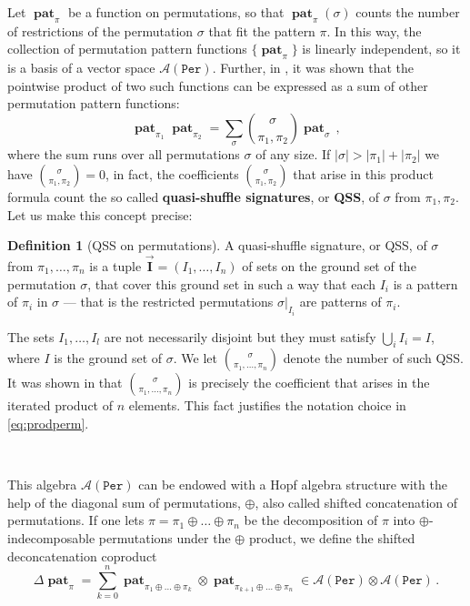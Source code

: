 \documentclass[12pt, reqno]{amsart}
\theoremstyle{definition}
\newtheorem{defin}[thm]{Definition}
\newcommand{\III}{\vec{\mathbf{I}}}
\DeclareMathOperator{\pat}{\mathbf{pat}}
\begin{document}
Let $\pat_{\pi}$ be a function on permutations, so that $\pat_{\pi}(\sigma)$ counts the number of restrictions of the permutation $\sigma$ that fit the pattern $\pi$.
In this way, the collection of permutation pattern functions $\{\pat_{\pi}\}$ is linearly independent, so it is a basis of a vector space $\mathcal A (\mathtt{Per})$.
Further, in \cite{Vargas}, it was shown that the pointwise product of two such functions can be expressed as a sum of other permutation pattern functions:
\begin{equation}\label{eq:prodperm}
\pat_{\pi_1} \pat_{\pi_2} = \sum_{\sigma} \binom{\sigma}{\pi_1, \pi_2} \pat_{\sigma} \, ,
\end{equation}
where the sum runs over all permutations $\sigma$ of any size.
If $|\sigma| > |\pi_1| + |\pi_2|$ we have $\binom{\sigma}{\pi_1, \pi_2} = 0$, in fact, the coefficients $\binom{\sigma}{\pi_1, \pi_2}$ that arise in this product formula count the so called \textbf{quasi-shuffle signatures}, or \textbf{QSS}, of $\sigma$ from $\pi_1, \pi_2$.
Let us make this concept precise:

\begin{defin}[QSS on permutations]
A quasi-shuffle signature, or QSS, of $\sigma$ from $\pi_1, \dots, \pi_n$ is a tuple $\III = (I_1, \dots, I_n)$ of sets on the ground set of the permutation $\sigma$, that cover this ground set in such a way that each $I_i$ is a pattern of $\pi_i$ in $\sigma$ --- that is the restricted permutations $\sigma|_{I_i}$ are patterns of $\pi_i$.

The sets $I_1, \ldots, I_l$ are not necessarily disjoint but they must satisfy $\bigcup_i I_i = I$, where $I$ is the ground set of $\sigma $.
We let $\binom{\sigma}{\pi_1, \dots, \pi_n}$ denote the number of such QSS.
It was shown in \cite{Penaguiao2020} that $\binom{\sigma}{\pi_1, \dots, \pi_n}$ is precisely the coefficient that arises in the iterated product of $n$ elements.
This fact justifies the notation choice in \eqref{eq:prodperm}.

\end{defin}

\

This algebra $\mathcal A(\mathtt{Per})$ can be endowed with a Hopf algebra structure with the help of the diagonal sum of permutations, $\oplus$, also called shifted concatenation of permutations.
If one lets $\pi = \pi_1 \oplus \dots \oplus \pi_n$ be the decomposition of $\pi$ into $\oplus$-indecomposable permutations under the $\oplus$ product, we define the shifted deconcatenation coproduct
$$\Delta \pat_{\pi} = \sum_{k=0}^n \pat_{\pi_1\oplus \dots \oplus \pi_k} \otimes \pat_{\pi_{k+1}\oplus \dots \oplus \pi_n} \in \mathcal A (\mathtt{Per}) \otimes \mathcal A (\mathtt{Per})\, .$$
\end{document}
